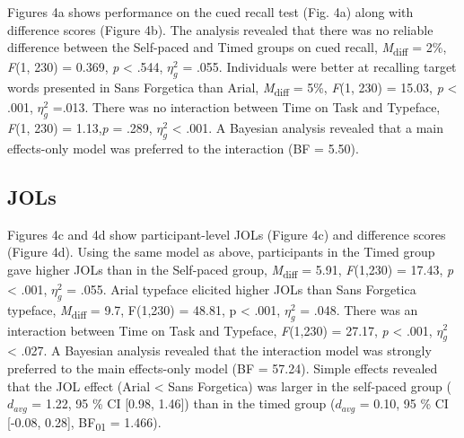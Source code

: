 \documentclass[
  english,
  jou]{apa7}
\begin{document}
Figures 4a shows performance on the cued recall test (Fig. 4a) along with difference scores (Figure 4b). The analysis revealed that there was no reliable difference between the Self-paced and Timed groups on cued recall, \emph{M}\textsubscript{diff} = 2\%, \emph{F}(1, 230) = 0.369, \emph{p} \textless{} .544, \(\eta_{g}^{2}\) = .055. Individuals were better at recalling target words presented in Sans Forgetica than Arial, \emph{M}\textsubscript{diff} = 5\%, \emph{F}(1, 230) = 15.03, \emph{p} \textless{} .001, \(\eta_{g}^{2}\) =.013. There was no interaction between Time on Task and Typeface, \emph{F}(1, 230) = 1.13,\emph{p} = .289, \(\eta_{g}^{2}\) \textless{} .001. A Bayesian analysis revealed that a main effects-only model was preferred to the interaction (BF = 5.50).

\hypertarget{jols-2}{%
\subsection{JOLs}\label{jols-2}}

Figures 4c and 4d show participant-level JOLs (Figure 4c) and difference scores (Figure 4d). Using the same model as above, participants in the Timed group gave higher JOLs than in the Self-paced group, \emph{M}\textsubscript{diff} = 5.91, \emph{F}(1,230) = 17.43, \emph{p} \textless{} .001, \(\eta_{g}^{2}\) = .055. Arial typeface elicited higher JOLs than Sans Forgetica typeface, \emph{M}\textsubscript{diff} = 9.7, F(1,230) = 48.81, p \textless{} .001, \(\eta_{g}^{2}\) = .048. There was an interaction between Time on Task and Typeface, \emph{F}(1,230) = 27.17, \emph{p} \textless{} .001, \(\eta_{g}^{2}\) \textless{} .027. A Bayesian analysis revealed that the interaction model was strongly preferred to the main effects-only model (BF = 57.24). Simple effects revealed that the JOL effect (Arial \textless{} Sans Forgetica) was larger in the self-paced group (\(d_{avg}\) = 1.22, 95 \% CI {[}0.98, 1.46{]}) than in the timed group (\(d_{avg}\) = 0.10, 95 \% CI {[}-0.08, 0.28{]}, BF\textsubscript{01} = 1.466).
\end{document}
